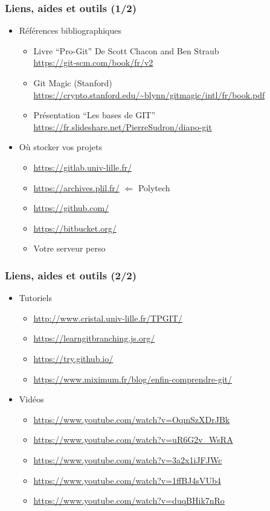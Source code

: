 \documentclass[table,tikz,12pt,svgnames]{beamer}
\begin{document}

\begin{frame}
\frametitle{Liens, aides et outils (1/2)}
\begin{itemize}
	\item Références bibliographiques
	\begin{itemize}
		\item Livre ``Pro-Git'' De Scott Chacon and Ben Straub\\
		\url{https://git-scm.com/book/fr/v2}
		\item Git Magic (Stanford)\\
		\url{https://crypto.stanford.edu/~blynn/gitmagic/intl/fr/book.pdf}
		\item Présentation ``Les bases de GIT''
		\url{https://fr.slideshare.net/PierreSudron/diapo-git}

	\end{itemize}
	\vspace{1em}

	\item Où stocker vos projets
	\begin{itemize}
		\item \url{https://gitlab.univ-lille.fr/}
		\item \url{https://archives.plil.fr/} $\Leftarrow$ Polytech
		\item \url{https://github.com/}
		\item \url{https://bitbucket.org/}
		\item Votre serveur perso
	\end{itemize}
\end{itemize}
\end{frame}

\begin{frame}
\frametitle{Liens, aides et outils (2/2)}
\begin{itemize}
	\item Tutoriels
	\begin{itemize}
		\item \url{http://www.cristal.univ-lille.fr/TPGIT/}
		\item \url{https://learngitbranching.js.org/}
		\item \url{https://try.github.io/}
		\item \url{https://www.miximum.fr/blog/enfin-comprendre-git/}
	\end{itemize}
	\item Vidéos
	\begin{itemize}
		\item \url{https://www.youtube.com/watch?v=OqmSzXDrJBk}
		\item \url{https://www.youtube.com/watch?v=uR6G2v_WsRA}
		\item \url{https://www.youtube.com/watch?v=3a2x1iJFJWc}
		\item \url{https://www.youtube.com/watch?v=1ffBJ4sVUb4}
		\item \url{https://www.youtube.com/watch?v=duqBHik7nRo}
	\end{itemize}
\end{itemize}
\end{frame}


\end{document}
